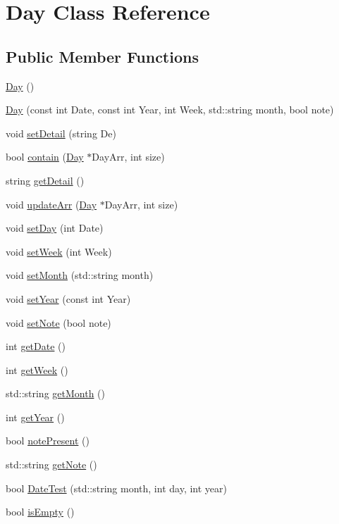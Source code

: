 \hypertarget{class_day}{}\section{Day Class Reference}
\label{class_day}
\subsection*{Public Member Functions}
\begin{DoxyCompactItemize}
\item 
\hyperlink{class_day_a0d38b5839dd80b179cb8f0669283b3aa}{Day} ()
\item 
\hyperlink{class_day_a1f2f885b1328511d8b96b050673ba35d}{Day} (const int Date, const int Year, int Week, std\+::string month, bool note)
\item 
void \hyperlink{class_day_acb0181b89543f4a0e71f85d5ddb78651}{set\+Detail} (string De)
\item 
bool \hyperlink{class_day_a75acf851742fcd7ba36b742056c42d69}{contain} (\hyperlink{class_day}{Day} $\ast$Day\+Arr, int size)
\item 
string \hyperlink{class_day_adf187d211b1ea4561832486f7094b18b}{get\+Detail} ()
\item 
void \hyperlink{class_day_a9e9004a3ecb48ce0c4749766bd228898}{update\+Arr} (\hyperlink{class_day}{Day} $\ast$Day\+Arr, int size)
\item 
void \hyperlink{class_day_a0dcbab77f0504f01fdd9a8584b590121}{set\+Day} (int Date)
\item 
void \hyperlink{class_day_abd9ffcfab90af3e2defaa2491a3761bb}{set\+Week} (int Week)
\item 
void \hyperlink{class_day_aa6fc8b1b08074305e6b0dd3f4bc21151}{set\+Month} (std\+::string month)
\item 
void \hyperlink{class_day_a9fc013d905327fd70003970125247d91}{set\+Year} (const int Year)
\item 
void \hyperlink{class_day_a40f873f51621bdb3cf657e127d43cdaf}{set\+Note} (bool note)
\item 
int \hyperlink{class_day_a6161ef9f7717d596af00031cc362fa04}{get\+Date} ()
\item 
int \hyperlink{class_day_a43799b84e1a16df9bf16b3de69605b9a}{get\+Week} ()
\item 
std\+::string \hyperlink{class_day_ae10fc576ccdf6d58ef42c8cd1b371401}{get\+Month} ()
\item 
int \hyperlink{class_day_acec9a2c25c4e19fa6f46cd2671dfa51d}{get\+Year} ()
\item 
bool \hyperlink{class_day_a097b2409c34e772e1b133c2c344ab2bf}{note\+Present} ()
\item 
std\+::string \hyperlink{class_day_ac0d1e5a970de4e30bc563c33cf69cbc3}{get\+Note} ()
\item 
bool \hyperlink{class_day_afb77f4b9df921cfb4176ba6ef309b9b8}{Date\+Test} (std\+::string month, int day, int year)
\item 
bool \hyperlink{class_day_aa4dd0d85c6fa11300b10c2a40c530c4f}{is\+Empty} ()
\end{DoxyCompactItemize}


